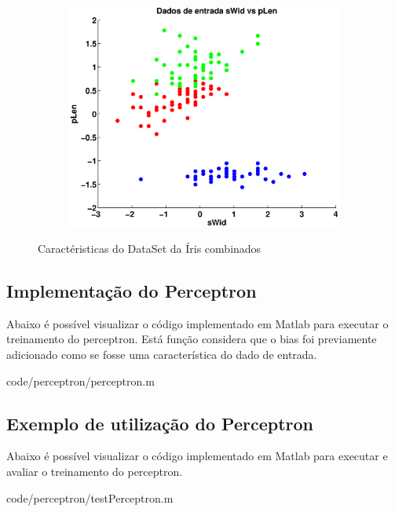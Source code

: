 \documentclass[12pt,journal,onecolumn]{IEEEtran}
\begin{document}
\begin{figure}[h]
\begin{subfigure}[h]{0.3\textwidth}
		\includegraphics[width=\textwidth]{eps/3classes/input/sWid-vs-pLen.eps}
	\end{subfigure} 
	\caption{Caractéristicas do DataSet da Íris combinados}
\end{figure}


\subsection{Implementação do Perceptron}

Abaixo é possível visualizar o código implementado em Matlab para executar o
treinamento do perceptron. Está função considera que o bias foi previamente
adicionado como se fosse uma característica do dado de entrada.

{code/perceptron/perceptron.m}


\subsection{Exemplo de utilização do Perceptron}

Abaixo é possível visualizar o código implementado em Matlab para executar e
avaliar o treinamento do perceptron. 

{code/perceptron/testPerceptron.m}
\ifCLASSOPTIONcaptionsoff
  \newpage
\fi



\end{document}
